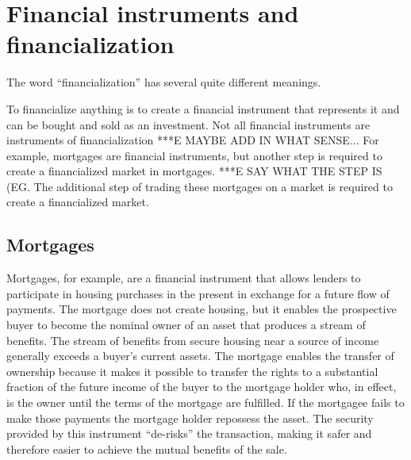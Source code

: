 

\section{Financial instruments and financialization} \label{section-financialize}
The word ``financialization'' has several quite different meanings.  


To financialize anything is to create a  \gls{financial instrument} that represents it and can be bought and sold as an investment. Not all financial instruments are instruments of financialization ***E MAYBE ADD IN WHAT SENSE... %
For example, mortgages are  financial instruments, but another step is required to create a financialized  market in mortgages. ***E SAY WHAT THE STEP IS (EG. The additional step of trading these mortgages on a market is required to create a financialized market. 


\subsection{Mortgages}
Mortgages, for example, are a financial instrument that allows lenders to  participate in housing purchases in the present in exchange for a future flow of payments.  The mortgage does not create housing, but it enables the prospective buyer to become the nominal owner of an asset that produces a stream of benefits. The stream of benefits from secure housing near a source of income generally exceeds a buyer's current assets. The mortgage enables the  transfer of ownership because it makes it possible to transfer the rights to a substantial fraction of the future income of the buyer to the mortgage holder who, in effect, is the owner until the terms of the mortgage are fulfilled.  If the mortgagee fails to make those payments the mortgage holder repossess the asset. The security provided by this instrument ``de-risks'' the transaction, making it safer and therefore easier to achieve the mutual benefits of the sale.

